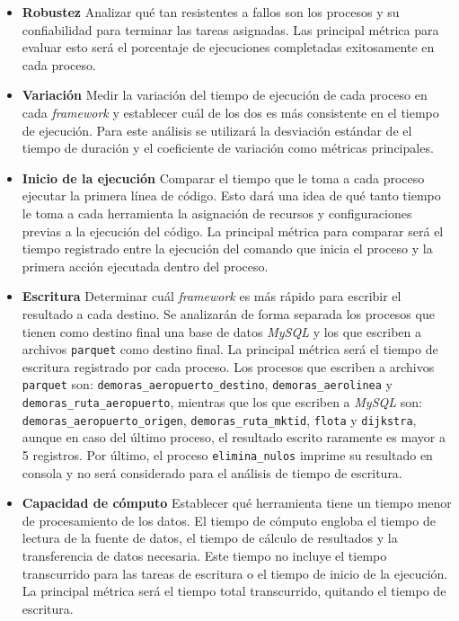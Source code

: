 \begin{itemize}
	
	\item \textbf{Robustez} Analizar qué tan resistentes a fallos son los procesos y su confiabilidad para terminar las tareas asignadas. Las principal métrica para evaluar esto será el porcentaje de ejecuciones completadas exitosamente en cada proceso.
	
	\item \textbf{Variación} Medir la variación del tiempo de ejecución de cada proceso en cada \textit{framework} y establecer cuál de los dos es más consistente en el tiempo de ejecución. Para este análisis se utilizará la desviación estándar de el tiempo de duración y el coeficiente de variación como métricas principales.
	
	\item \textbf{Inicio de la ejecución} Comparar el tiempo que le toma a cada proceso ejecutar la primera línea de código. Esto dará una idea de qué tanto tiempo le toma a cada herramienta la asignación de recursos y configuraciones previas a la ejecución del código. La principal métrica para comparar será el tiempo registrado entre la ejecución del comando que inicia el proceso y la primera acción ejecutada dentro del proceso.
	
	\item \textbf{Escritura} Determinar cuál \textit{framework} es más rápido para escribir el resultado a cada destino. Se analizarán de forma separada los procesos que tienen como destino final una base de datos \textit{MySQL} y los que escriben a archivos \texttt{parquet} como destino final. La principal métrica será el tiempo de escritura registrado por cada proceso. Los procesos que escriben a archivos \texttt{parquet} son: \texttt{demoras\_aeropuerto\_destino}, \texttt{demoras\_aerolinea} y \texttt{demoras\_ruta\_aeropuerto}, mientras que los que escriben a \textit{MySQL} son: \texttt{demoras\_aeropuerto\_origen}, \texttt{demoras\_ruta\_mktid}, \texttt{flota} y \texttt{dijkstra}, aunque en caso del último proceso, el resultado escrito raramente es mayor a 5 registros. Por último, el proceso \texttt{elimina\_nulos} imprime su resultado en consola y no será considerado para el análisis de tiempo de escritura.
	
	\item \textbf{Capacidad de cómputo} Establecer qué herramienta tiene un tiempo menor de procesamiento de los datos. El tiempo de cómputo engloba el tiempo de lectura de la fuente de datos, el tiempo de cálculo de resultados y la transferencia de datos necesaria. Este tiempo no incluye el tiempo transcurrido para las tareas de escritura o el tiempo de inicio de la ejecución. La principal métrica será el tiempo total transcurrido, quitando el tiempo de escritura.
	

\end{itemize}
